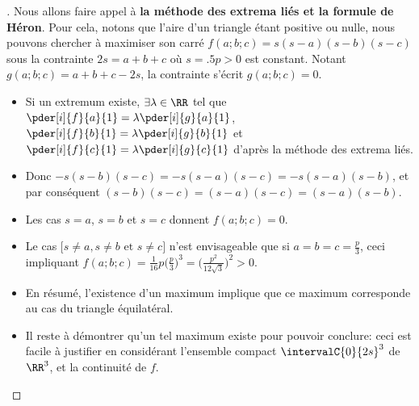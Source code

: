 \begin{proof}[] \label{constrained-extrema}
	Nous allons faire appel à \textbf{la méthode des extrema liés et la formule de Héron}.
	Pour cela, notons que l'aire d'un triangle étant positive ou nulle, nous pouvons chercher à maximiser son carré
	$f(a;b;c) = s(s - a)(s - b)(s - c)$
	sous la contrainte $2s = a + b + c$ où $s = \num{.5} p > 0$ est constant.
	Notant $g(a;b;c) = a + b + c - 2 s$, la contrainte s'écrit $g(a;b;c) = 0$.
	\begin{itemize}
		\item Si un extremum existe,
    	$\exists \lambda \in \RR$ tel que
    	$\pder[i]{f}{a}{1} = \lambda \pder[i]{g}{a}{1}$,
    	$\pder[i]{f}{b}{1} = \lambda \pder[i]{g}{b}{1}$ et
    	$\pder[i]{f}{c}{1} = \lambda \pder[i]{g}{c}{1}$
		d'après la méthode des extrema liés.

		\item Donc
		$- s(s - b)(s - c) = - s(s - a)(s - c) = - s(s - a)(s - b)$,
		et par conséquent
		$(s - b)(s - c) = (s - a)(s - c) = (s - a)(s - b)$.

		\item Les cas $s = a$, $s = b$ et $s = c$ donnent $f(a;b;c) = 0$.

		\item Le cas $\big[ s \neq a, s \neq b \text{ et } s \neq c \big]$ n'est envisageable que si $a = b = c = \frac{p}{3}$, ceci impliquant $f(a;b;c) = \frac{1}{16} p \big( \frac{p}{3} \big)^3 = \big( \frac{p^2}{12 \sqrt{3}} \big)^2 > 0$.

		\item En résumé, l'existence d'un maximum implique que ce maximum corresponde au cas du triangle équilatéral.

		\item Il reste à démontrer qu'un tel maximum existe pour pouvoir conclure: ceci est facile à justifier en considérant l'ensemble compact $\intervalC{0}{2s}^3$ de $\RR^3$, et la continuité de $f$.
	\end{itemize}
	
	\null\vspace{-6ex}
\end{proof}
